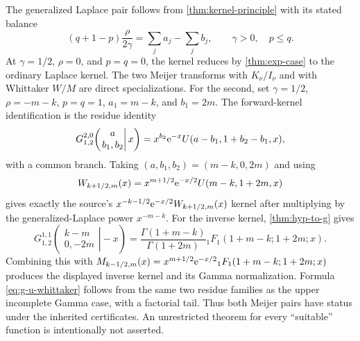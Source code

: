 The generalized Laplace pair follows from \cref{thm:kernel-principle} with its
stated balance
\[
 (q+1-p)\frac{\rho}{2\gamma}=\sum_ja_j-\sum_jb_j,
 \qquad \gamma>0,\quad p\le q.
\]
At $\gamma=1/2$, $\rho=0$, and $p=q=0$, the kernel reduces by
\cref{thm:exp-case} to the ordinary Laplace kernel.  The two Meijer transforms
with $K_\nu/I_\nu$ and with Whittaker $W/M$ are direct specializations.  For the
second, set $\gamma=1/2$, $\rho=-m-k$, $p=q=1$, $a_1=m-k$, and $b_1=2m$.
The forward-kernel identification is the residue identity
\begin{equation}\label{eq:g-u-whittaker}
 G_{1,2}^{2,0}\!\left(
  \left.\begin{matrix}a\\b_1,b_2\end{matrix}\right|x\right)
 =x^{b_2}\mathrm e^{-x}U(a-b_1,1+b_2-b_1,x),
\end{equation}
with a common branch.  Taking $(a,b_1,b_2)=(m-k,0,2m)$ and using
\[
 W_{k+1/2,m}(x)=x^{m+1/2}\mathrm e^{-x/2}U(m-k,1+2m,x)
\]
gives exactly the source's $x^{-k-1/2}\mathrm e^{-x/2}W_{k+1/2,m}(x)$ kernel after
multiplying by the generalized-Laplace power $x^{-m-k}$.  For the inverse
kernel, \cref{thm:hyp-to-g} gives
\[
 G_{1,2}^{1,1}\!\left(
 \left.\begin{matrix}k-m\\0,-2m\end{matrix}\right|-x\right)
 =\frac{\Gamma(1+m-k)}{\Gamma(1+2m)}
 {}_1F_1(1+m-k;1+2m;x).
\]
Combining this with
$M_{k-1/2,m}(x)=x^{m+1/2}\mathrm e^{-x/2}
 {}_1F_1(1+m-k;1+2m;x)$ produces the displayed inverse kernel and its Gamma
normalization.  Formula \eqref{eq:g-u-whittaker} follows from the same two
residue families as the upper incomplete Gamma case, with a factorial tail.
Thus both Meijer pairs have status \statusQ under the inherited certificates.
An unrestricted theorem for every ``suitable'' function is intentionally not
asserted.

